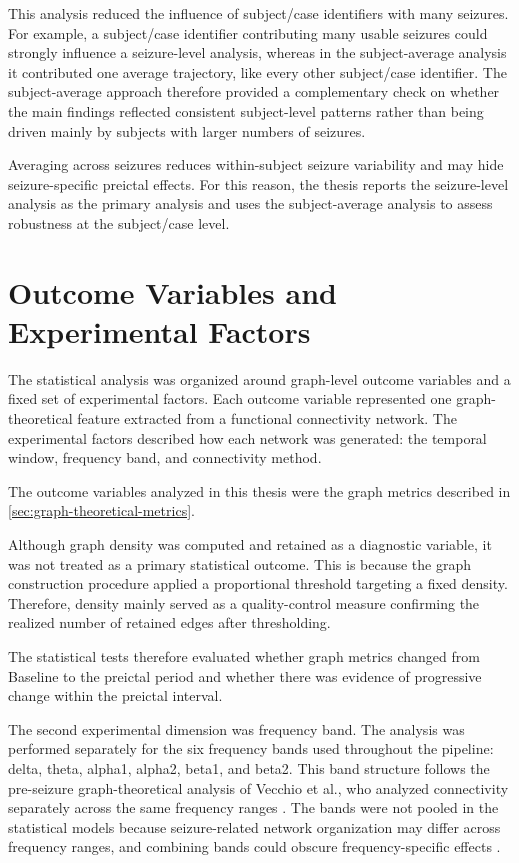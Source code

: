 This analysis reduced the influence of subject/case identifiers with many
seizures. For example, a subject/case identifier contributing many usable
seizures could strongly influence a seizure-level analysis, whereas in the
subject-average analysis it contributed one average trajectory, like every
other subject/case identifier. The subject-average approach therefore provided
a complementary check on whether the main findings reflected consistent
subject-level patterns rather than being driven mainly by subjects with larger
numbers of seizures.

Averaging across seizures reduces
within-subject seizure variability and may hide seizure-specific preictal
effects. For this reason, the thesis reports the seizure-level analysis as the
primary analysis and uses the subject-average analysis to assess robustness at
the subject/case level.

\section{Outcome Variables and Experimental Factors}
\label{sec:outcome-variables-experimental-factors}

The statistical analysis was organized around graph-level outcome variables and
a fixed set of experimental factors. Each outcome variable represented one
graph-theoretical feature extracted from a functional connectivity network.
The experimental factors described how each network was generated: the temporal
window, frequency band, and connectivity method.

The outcome variables analyzed in this thesis were the graph metrics described
in \cref{sec:graph-theoretical-metrics}.

Although graph density was computed and retained as a diagnostic variable, it
was not treated as a primary statistical outcome. This is because the graph
construction procedure applied a proportional threshold targeting a fixed
density. Therefore, density mainly served as a quality-control measure
confirming the realized number of retained edges after thresholding.

The statistical tests therefore evaluated whether graph metrics changed from
Baseline to the preictal period and whether there was evidence of progressive
change within the preictal interval.

The second experimental dimension was frequency band. The analysis was
performed separately for the six frequency bands used throughout the pipeline:
delta, theta, alpha1, alpha2, beta1, and beta2. This band structure follows the
pre-seizure graph-theoretical analysis of Vecchio et al., who analyzed
connectivity separately across the same frequency ranges \cite{Vecchio2016}.
The bands were not pooled in the statistical models because seizure-related
network organization may differ across frequency ranges, and combining bands
could obscure frequency-specific effects \cite{Ponten2007,Lanzone2022}.

